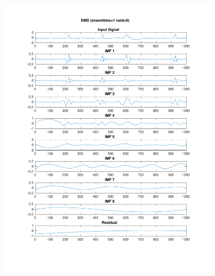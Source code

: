 \documentclass[11pt,a4paper]{article}
\begin{document}
\begin{figure}[H]
\centering
\begin{minipage}{0.48\textwidth}
	\centering
	\includegraphics[width=\textwidth]{fig/221l1_emd.pdf}
	

\end{minipage}
\end{figure}
\end{document}
